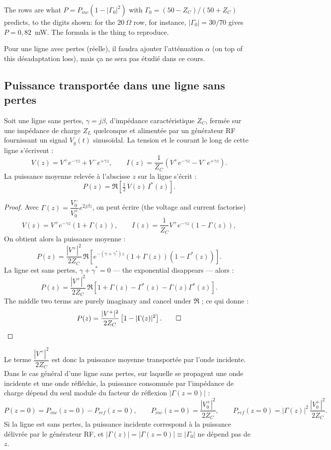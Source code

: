 \begin{remark}
  The rows are what $P = P_{inc}\left(1-|\Gamma_0|^2\right)$ with
  $\Gamma_0 = (50-Z_C)/(50+Z_C)$ predicts, to the digits shown: for the
  $20\ \Omega$ row, for instance, $|\Gamma_0| = 30/70$ gives
  $P = 0{,}82$~mW. The formula is the thing to reproduce.
\end{remark}

Pour une ligne avec pertes (réelle), il faudra ajouter l'atténuation $\alpha$
(on top of this désadaptation loss), mais ça ne sera pas étudié dans ce cours.

\subsection{Puissance transportée dans une ligne sans pertes}
Soit une ligne sans pertes, $\gamma = j\beta$, d'impédance caractéristique
$Z_C$, fermée sur une impédance de charge $Z_L$ quelconque et alimentée par un
générateur RF fournissant un signal $V_g(t)$ sinusoïdal. La tension et le
courant le long de cette ligne s'écrivent :
\[
  V(z) = V^{+}e^{-\gamma z} + V^{-}e^{+\gamma z},
  \qquad
  I(z) = \frac{1}{Z_C}\left(V^{+}e^{-\gamma z} - V^{-}e^{+\gamma z}\right).
\]
La puissance moyenne relevée à l'abscisse $z$ sur la ligne s'écrit :
\[
  P(z) = \Re\!\left[\tfrac{1}{2}\,V(z)\,I^{*}(z)\right].
\]

\begin{proof}
  Avec $\Gamma(z) = \dfrac{V_0^{-}}{V_0^{+}}e^{2j\beta z}$, on peut écrire
  (the voltage and current factorise)
  \[
    V(z) = V^{+}e^{-\gamma z}\left(1 + \Gamma(z)\right),
    \qquad
    I(z) = \frac{1}{Z_C}V^{+}e^{-\gamma z}\left(1 - \Gamma(z)\right),
  \]
  On obtient alors la puissance moyenne :
  \[
    P(z) = \frac{|V^{+}|^{2}}{2Z_C}\,
      \Re\!\left[e^{-(\gamma+\gamma^{*})z}
      \left(1+\Gamma(z)\right)\left(1-\Gamma^{*}(z)\right)\right].
  \]
  La ligne est sans pertes, $\gamma + \gamma^{*} = 0$ --- the exponential
  disappears --- alors :
  \[
    P(z) = \frac{|V^{+}|^{2}}{2Z_C}\,
      \Re\!\left[1 + \Gamma(z) - \Gamma^{*}(z) - \Gamma(z)\Gamma^{*}(z)\right].
  \]
  The middle two terms are purely imaginary and cancel under $\Re$ ; ce qui
  donne :
  \[
    P(z) = \frac{|V^{+}|^{2}}{2Z_C}\left[1 - |\Gamma(z)|^{2}\right]. \qed
  \]
\end{proof}

Le terme $\dfrac{|V^{+}|^{2}}{2Z_C}$ est donc la puissance moyenne transportée
par l'onde incidente. Dans le cas général d'une ligne sans pertes, sur laquelle
se propagent une onde incidente et une onde réfléchie, la puissance consommée
par l'impédance de charge dépend du seul module du facteur de réflexion
$|\Gamma(z=0)|$ :
\[
  P(z=0) = P_{inc}(z=0) - P_{ref}(z=0),
  \qquad
  P_{inc}(z=0) = \frac{|V_0^{+}|^{2}}{2Z_C},
  \qquad
  P_{ref}(z=0) = |\Gamma(z)|^{2}\,\frac{|V_0^{+}|^{2}}{2Z_C}.
\]
Si la ligne est sans pertes, la puissance incidente correspond à la puissance
délivrée par le générateur RF, et $|\Gamma(z)| = |\Gamma(z=0)| \equiv
|\Gamma_0|$ ne dépend pas de $z$.

